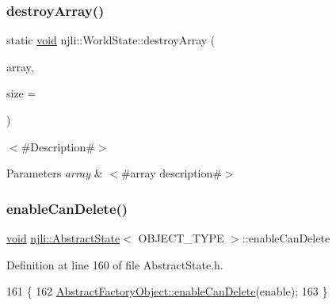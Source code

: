 \subsubsection{\texorpdfstring{destroy\+Array()}{destroyArray()}}
{\footnotesize\ttfamily static \mbox{\hyperlink{_thread_8h_af1e856da2e658414cb2456cb6f7ebc66}{void}} njli\+::\+World\+State\+::destroy\+Array (\begin{DoxyParamCaption}\item[{\mbox{\hyperlink{classnjli_1_1_world_state}{World\+State}} $\ast$$\ast$}]{array,  }\item[{const \mbox{\hyperlink{_util_8h_a10e94b422ef0c20dcdec20d31a1f5049}{u32}}}]{size = {} }\end{DoxyParamCaption})\hspace{0.3cm}{\ttfamily [static]}}

$<$\#\+Description\#$>$


\begin{DoxyParams}{Parameters}
{\em array} & $<$\#array description\#$>$ \\
\hline
\end{DoxyParams}
\mbox{\label{classnjli_1_1_world_state_a4ed007508bd8f80af668a302376b7d1a}} 
\subsubsection{\texorpdfstring{enable\+Can\+Delete()}{enableCanDelete()}}
{\footnotesize\ttfamily \mbox{\hyperlink{_thread_8h_af1e856da2e658414cb2456cb6f7ebc66}{void}} \mbox{\hyperlink{classnjli_1_1_abstract_state}{njli\+::\+Abstract\+State}}$<$ O\+B\+J\+E\+C\+T\+\_\+\+T\+Y\+PE $>$\+::enable\+Can\+Delete}



Definition at line 160 of file Abstract\+State.\+h.


\begin{DoxyCode}
161   \{
162     \mbox{\hyperlink{classnjli_1_1_abstract_factory_object_a678b8f28320f6a7e2aa38d5ef72889a8}{AbstractFactoryObject::enableCanDelete}}(enable);
163   \}
\end{DoxyCode}
\mbox{\label{classnjli_1_1_world_state_aa4e66d0016cd5c43dc3a485eaf558174}} 
